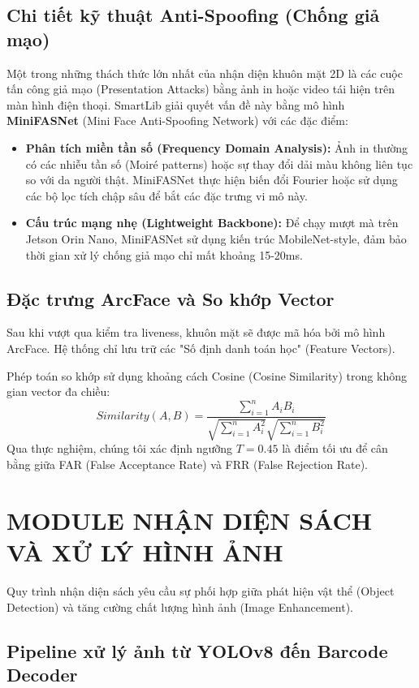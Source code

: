 \documentclass[12pt,a4paper]{article}
\begin{document}
\subsection{Chi tiết kỹ thuật Anti-Spoofing (Chống giả mạo)}
Một trong những thách thức lớn nhất của nhận diện khuôn mặt 2D là các cuộc tấn công giả mạo (Presentation Attacks) bằng ảnh in hoặc video tái hiện trên màn hình điện thoại. SmartLib giải quyết vấn đề này bằng mô hình \textbf{MiniFASNet} (Mini Face Anti-Spoofing Network) với các đặc điểm:

\begin{itemize}
    \item \textbf{Phân tích miền tần số (Frequency Domain Analysis):} Ảnh in thường có các nhiễu tần số (Moiré patterns) hoặc sự thay đổi dải màu không liên tục so với da người thật. MiniFASNet thực hiện biến đổi Fourier hoặc sử dụng các bộ lọc tích chập sâu để bắt các đặc trưng vi mô này.
    \item \textbf{Cấu trúc mạng nhẹ (Lightweight Backbone):} Để chạy mượt mà trên Jetson Orin Nano, MiniFASNet sử dụng kiến trúc MobileNet-style, đảm bảo thời gian xử lý chống giả mạo chỉ mất khoảng 15-20ms.
\end{itemize}

\subsection{Đặc trưng ArcFace và So khớp Vector}
Sau khi vượt qua kiểm tra liveness, khuôn mặt sẽ được mã hóa bởi mô hình ArcFace. Hệ thống chỉ lưu trữ các "Số định danh toán học" (Feature Vectors). 

Phép toán so khớp sử dụng khoảng cách Cosine (Cosine Similarity) trong không gian vector đa chiều:
\[
Similarity(A, B) = \frac{\sum_{i=1}^{n} A_i B_i}{\sqrt{\sum_{i=1}^{n} A_i^2} \sqrt{\sum_{i=1}^{n} B_i^2}}
\]
Qua thực nghiệm, chúng tôi xác định ngưỡng $T = 0.45$ là điểm tối ưu để cân bằng giữa FAR (False Acceptance Rate) và FRR (False Rejection Rate).

\section{MODULE NHẬN DIỆN SÁCH VÀ XỬ LÝ HÌNH ẢNH}

Quy trình nhận diện sách yêu cầu sự phối hợp giữa phát hiện vật thể (Object Detection) và tăng cường chất lượng hình ảnh (Image Enhancement).

\subsection{Pipeline xử lý ảnh từ YOLOv8 đến Barcode Decoder}
\end{document}
